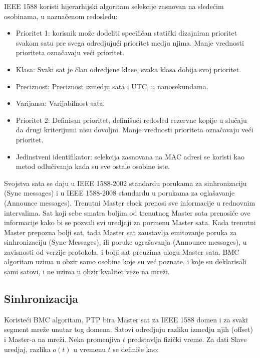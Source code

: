 \documentclass[a4paper,12pt, master]{etf}
\begin{document}
	IEEE 1588 koristi hijerarhijski algoritam selekcije zasnovan na slede\'{c}im osobinama, u
	nazna\v{c}enom redosledu:

        \begin{itemize}
            \item Prioritet 1: korisnik mo\v{z}e dodeliti specifi\v{c}an stati\v{c}ki dizajniran prioritet
            svakom satu pre	svega odredjuju\'{c}i prioritet medju njima. Manje vrednosti prioriteta
            ozna\v{c}avaju ve\'{c}i prioritet.
                \item Klasa: Svaki sat je \v{c}lan odredjene klase, svaka klasa dobija svoj prioritet.
                \item Preciznost: Preciznost izmedju sata i UTC, u nanosekundama.
                \item Varijansa: Varijabilnost sata.
            \item Prioritet 2: Definisan prioritet, defini\v{s}u\'{c}i redosled rezervne kopije u slu\v{c}aju
            da drugi kriterijumi nisu dovoljni. Manje vrednosti prioriteta ozna\v{c}avaju ve\'{c}i prioritet.
                \item Jedinstveni identifikator: selekcija zasnovana na MAC adresi se koristi kao metod
                odlu\v{c}ivanja	kada su sve ostale osobine iste.
        \end{itemize}

        Svojstva sata se daju u IEEE 1588-2002 standardu porukama za sinhronizaciju (Sync messages) i u
        IEEE 1588-2008 standardu u porukama za ogla\v{s}avanje (Announce messages). Trenutni Master clock
	prenosi sve informacije u rednovnim intervalima. Sat koji sebe smatra boljim od trenutnog Master
        sata prenosi\'{c}e ove informacije kako bi se pozvali svi uredjaji za
        pormenu Master sata. Kada trenutni Master prepozna bolji sat, tada Master sat
	zaustavlja emitovanje poruka za sinhronizaciju (Sync Messages), ili poruke ogra\v{s}avanja
	(Announce messages), u zavisnosti od verzije protokola, i bolji sat preuzima ulogu Master
	sata. BMC algoritam uzima u obzir samo osobine koje su ve\'{c} poznate, i koje su deklarisali
	sami satovi, i ne uzima u obzir kvalitet veze na mre\v{z}i.

	\subsection{Sinhronizacija}

	Koriste\'{c}i BMC algoritam, PTP bira Master sat za IEEE 1588 domen i za svaki segment mre\v{z}e
        unutar tog domena. Satovi odredjuju razliku izmedju njih (offset) i Master-a na mre\v{z}i. Neka
        promenjiva $t$ predstavlja fizi\v{c}ki vreme. Za dati Slave uredjaj, razlika $o(t)$ u vremenu $t$
        se defini\v{s}e kao:
\end{document}
